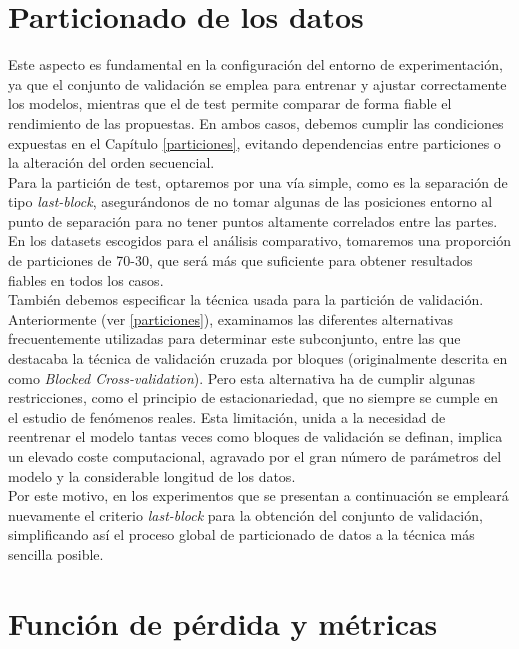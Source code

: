 \section{Particionado de los datos}

Este aspecto es fundamental en la configuración del entorno de experimentación, ya que el conjunto de validación se emplea para entrenar y ajustar correctamente los modelos, mientras que el de test permite comparar de forma fiable el rendimiento de las propuestas. En ambos casos, debemos cumplir las condiciones expuestas en el Capítulo \ref{particiones}, evitando dependencias entre particiones o la alteración del orden secuencial.\\

Para la partición de test, optaremos por una vía simple, como es la separación de tipo \textit{last-block}, asegurándonos de no tomar algunas de las posiciones entorno al punto de separación para no tener puntos altamente correlados entre las partes. En los datasets escogidos para el análisis comparativo, tomaremos una proporción de particiones de 70-30, que será más que suficiente para obtener resultados fiables en todos los casos.\\
 
También debemos especificar la técnica usada para la partición de validación. Anteriormente (ver \ref{particiones}), examinamos las diferentes alternativas frecuentemente utilizadas para determinar este subconjunto, entre las que destacaba la técnica de validación cruzada por bloques (originalmente descrita en \cite{bergmeir2012use} como \textit{Blocked Cross-validation}). Pero esta alternativa ha de cumplir algunas restricciones, como el principio de estacionariedad, que no siempre se cumple en el estudio de fenómenos reales. Esta limitación, unida a la necesidad de reentrenar el modelo tantas veces como bloques de validación se definan, implica un elevado coste computacional, agravado por el gran número de parámetros del modelo y la considerable longitud de los datos.\\

Por este motivo, en los experimentos que se presentan a continuación se empleará nuevamente el criterio \textit{last-block} para la obtención del conjunto de validación, simplificando así el proceso global de particionado de datos a la técnica más sencilla posible.

\section{Función de pérdida y métricas}

